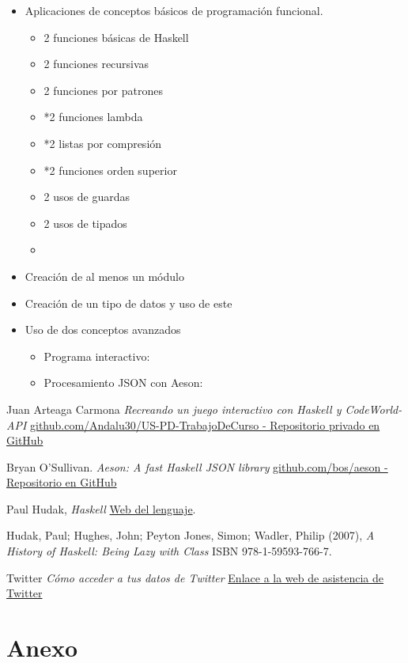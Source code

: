 \documentclass[11pt]{article}
\begin{document}
\begin{itemize}
    \item Aplicaciones de conceptos básicos de programación funcional.
    \begin{itemize}
        \item 2 funciones básicas de Haskell
        \item 2 funciones recursivas
        \item 2 funciones por patrones
        \item *2 funciones lambda
        \item *2 listas por compresión
        \item *2 funciones orden superior
        \item 2 usos de guardas
        \item 2 usos de tipados
        \item 
    \end{itemize}
    
    \item Creación de al menos un módulo
    \item Creación de un tipo de datos y uso de este
    \item Uso de dos conceptos avanzados
    \begin{itemize}
        \item Programa interactivo:
        \item Procesamiento JSON con Aeson:
    \end{itemize}
    
\end{itemize}



\begin{thebibliography}{99}

 Juan Arteaga Carmona \textit{Recreando un juego interactivo con Haskell y CodeWorld-API} \href{https://github.com/Andalu30/US-PD-TrabajoDeCurso}{github.com/Andalu30/US-PD-TrabajoDeCurso - Repositorio privado en GitHub}

 Bryan O'Sullivan. \textit{Aeson: A fast Haskell JSON library} \href{https://github.com/bos/aeson}{github.com/bos/aeson - Repositorio en GitHub}

 Paul Hudak, \textit{Haskell} \href{https://www.haskell.org/}{ Web del lenguaje}.

 Hudak, Paul; Hughes, John; Peyton Jones, Simon; Wadler, Philip (2007), \textit{A History of Haskell: Being Lazy with Class} ISBN 978-1-59593-766-7.

 Twitter \textit{Cómo acceder a tus datos de Twitter} \href{https://help.twitter.com/es/managing-your-account/accessing-your-twitter-data}{Enlace a la web de asistencia de Twitter}







\end{thebibliography}


\section*{Anexo}
\end{document}
